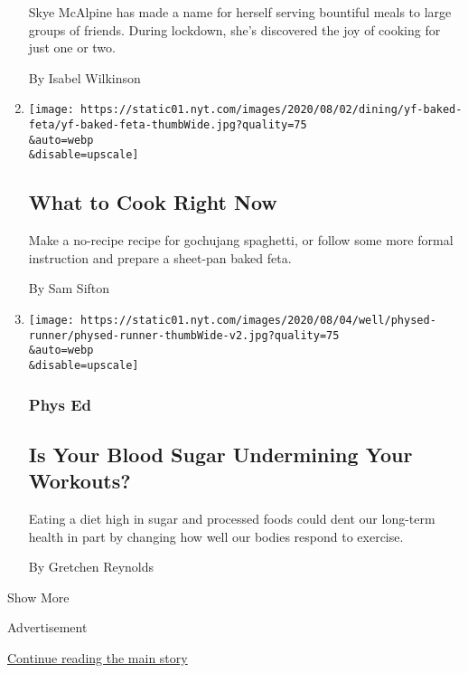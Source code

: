 \begin{enumerate}
  Skye McAlpine has made a name for herself serving bountiful meals to
  large groups of friends. During lockdown, she's discovered the joy of
  cooking for just one or two.

  By Isabel Wilkinson
\item
  \href{/2020/07/29/dining/what-to-cook-right-now.html}{}

  \texttt{[image: https://static01.nyt.com/images/2020/08/02/dining/yf-baked-feta/yf-baked-feta-thumbWide.jpg?quality=75\\\&auto=webp\\\&disable=upscale]}

  \hypertarget{what-to-cook-right-now}{%
  \subsection{What to Cook Right Now}\label{what-to-cook-right-now}}

  Make a no-recipe recipe for gochujang spaghetti, or follow some more
  formal instruction and prepare a sheet-pan baked feta.

  By Sam Sifton
\item
  \href{/2020/07/29/well/move/blood-sugar-diet-foods-workouts-exercise-muscles.html}{}

  \texttt{[image: https://static01.nyt.com/images/2020/08/04/well/physed-runner/physed-runner-thumbWide-v2.jpg?quality=75\\\&auto=webp\\\&disable=upscale]}

  \hypertarget{phys-ed}{%
  \subsubsection{Phys Ed}\label{phys-ed}}

  \hypertarget{is-your-blood-sugar-undermining-your-workouts}{%
  \subsection{Is Your Blood Sugar Undermining Your
  Workouts?}\label{is-your-blood-sugar-undermining-your-workouts}}

  Eating a diet high in sugar and processed foods could dent our
  long-term health in part by changing how well our bodies respond to
  exercise.

  By Gretchen Reynolds
\end{enumerate}

Show More

Advertisement

\protect\hyperlink{after-mid2}{Continue reading the main story}

